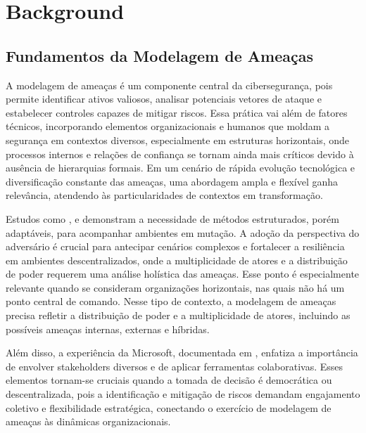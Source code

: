 
%

\chapter{Background}
\label{cha:background}

\glsresetall

\section{Fundamentos da Modelagem de Ameaças}
\label{sec:fundamentos_da_modelagem_de_ameacas}

A modelagem de ameaças é um componente central da cibersegurança, pois
permite identificar ativos valiosos, analisar potenciais vetores de
ataque e estabelecer controles capazes de mitigar riscos. Essa prática
vai além de fatores técnicos, incorporando elementos organizacionais e
humanos que moldam a segurança em contextos diversos, especialmente em
estruturas horizontais, onde processos internos e relações de confiança
se tornam ainda mais críticos devido à ausência de hierarquias formais.
Em um cenário de rápida evolução tecnológica e diversificação constante
das ameaças, uma abordagem ampla e flexível ganha relevância, atendendo
às particularidades de contextos em transformação.

Estudos como \cite{ThreatModelingAsABasisForSecurityRequirements},
\cite{AdvancedThreatModeling} e
\cite{DemystifyingTheThreatModelingProcess} demonstram a necessidade
de métodos estruturados, porém adaptáveis, para acompanhar ambientes
em mutação. A adoção da perspectiva do adversário \cite{AHybridThreatModelingMethod}
é crucial para antecipar cenários complexos e fortalecer a resiliência
em ambientes descentralizados, onde a multiplicidade de atores e a
distribuição de poder requerem uma análise holística das ameaças.
Esse ponto é especialmente relevante quando se consideram organizações
horizontais, nas quais não há um ponto central de comando.
Nesse tipo de contexto, a modelagem de ameaças precisa refletir
a distribuição de poder e a multiplicidade de atores, incluindo as
possíveis ameaças internas, externas e híbridas.

Além disso, a experiência da Microsoft, documentada em
\cite{ExperiencesThreatModelingAtMicrosoft}, enfatiza a importância de
envolver stakeholders diversos e de aplicar ferramentas colaborativas.
Esses elementos tornam-se cruciais quando a tomada de decisão é
democrática ou descentralizada, pois a identificação e mitigação de
riscos demandam engajamento coletivo e flexibilidade estratégica,
conectando o exercício de modelagem de ameaças às dinâmicas
organizacionais.

